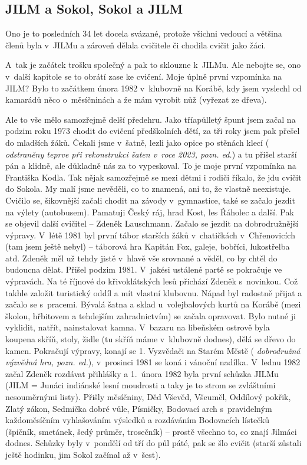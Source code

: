 \documentclass[a5paper, 11pt, twoside]{article}
\newcommand{\pozned}[1]{%
\textit{#1}}
\begin{document}
\vspace{\fill}

\subsection{JILM a Sokol, Sokol a JILM}

Ono je to posledních 34 let docela svázané, protože všichni vedoucí a
většina členů byla v~JILMu a zároveň dělala cvičitele či chodila cvičit
jako žáci.

A~tak je začátek trošku společný a pak to sklouzne k~JILMu. Ale nebojte
se, ono v~další kapitole se to obrátí zase ke cvičení. Moje úplně první
vzpomínka na JILM? Bylo to začátkem února 1982 v~klubovně na Korábě, kdy
jsem vyslechl od kamarádů něco o~měsíčninách a že mám vyrobit nůž
(vyřezat ze dřeva).

Ale to vše mělo samozřejmě delší předehru. Jako tříapůlletý špunt jsem
začal na podzim roku 1973 chodit do cvičení předškolních dětí, za tři
roky jsem pak přešel do mladších žáků. Čekali jsme v~šatně, lezli jako
opice po stěnách klecí (\pozned{odstraněny teprve při rekonstrukci šaten
v~roce 2023, pozn. ed.}) a tu přišel starší pán a klidně, ale důkladně nás
za to vypeskoval. To je moje první vzpomínka na Františka Kodla. Tak
nějak samozřejmě se mezi dětmi i rodiči říkalo, že jdu cvičit do Sokola.
My malí jsme nevěděli, co to znamená, ani to, že vlastně neexistuje.
Cvičilo se, šikovnější začali chodit na závody v~gymnastice, také se
začalo jezdit na výlety (autobusem). Pamatuji Český ráj, hrad Kost, les
Řáholec a další. Pak se objevil další cvičitel -- Zdeněk Lauschmann.
Začalo se jezdit na dobrodružnější výpravy. V~létě 1981 byl první tábor
starších žáků v~chatičkách v~Chřenovicích (tam jsem ještě nebyl) --
táborová hra Kapitán Fox, galeje, bobříci, lukostřelba atd. Zdeněk měl
už tehdy jistě v~hlavě vše srovnané a věděl, co by chtěl do budoucna
dělat. Přišel podzim 1981. V~jakési ustálené partě se pokračuje ve
výpravách. Na té říjnové do křivoklátských lesů přichází Zdeněk
s~novinkou. Což takhle založit turistický oddíl a mít vlastní klubovnu.
Nápad byl radostně přijat a začalo se s~pracemi. Bývalá šatna a sklad
u~volejbalových kurtů na Korábě (mezi školou, hřbitovem a tehdejším
zahradnictvím) se začala opravovat. Bylo nutné ji vyklidit, natřít,
nainstalovat kamna. V~bazaru na libeňském ostrově byla koupena skříň,
stoly, židle (tu skříň máme v~klubovně dodnes), dělá se dřevo do kamen.
Pokračují výpravy, konají se 1. Vyzvědači na Starém Městě
(\pozned{dobrodružná výzvědná hra, pozn. ed.}), v~prosinci 1981 se koná i
vánoční nadílka. V~lednu 1982 začal Zdeněk rozdávat přihlášky a 1.~února
1982 byla první schůzka JILMu (JILM = Junáci indiánské lesní moudrosti a
taky je to strom se zvláštními nesouměrnými listy). Přišly měsíčniny,
Děd Vševěd, Všeuměl, Oddílový pokřik, Zlatý zákon, Sedmička dobré vůle,
Písničky, Bodovací arch s~pravidelným každoměsíčním vyhlašováním
výsledků a rozdáváním Bodovacích lístečků (špičník, smetánek, šedý
průměr, trosečník) -- prostě všechno to, co znají Jilmáci dodnes.
Schůzky byly v~pondělí od tří do půl páté, pak se šlo cvičit (starší
zůstali ještě hodinku, jim Sokol začínal až v~šest).
\end{document}

